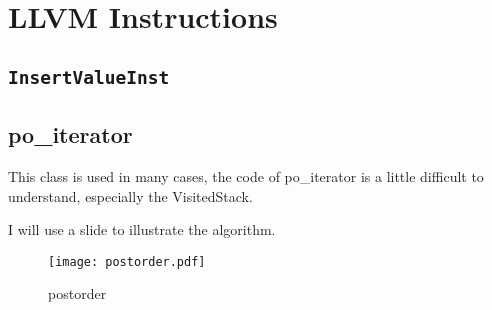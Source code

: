 \newpage


\section{LLVM Instructions}

\subsection{\texttt{InsertValueInst}}


\subsection{po\_iterator}


This class is used in many cases, the code of po\_iterator
is a little difficult to understand, especially the VisitedStack.

I will use a slide to illustrate the algorithm.

\begin{figure}[H]
    \centering
    \texttt{[image: postorder.pdf]}
    \caption{postorder}
    \label{fig:postorder}
\end{figure}

